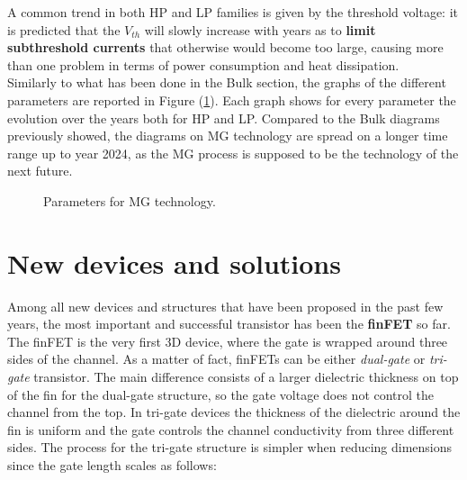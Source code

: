 \documentclass[a4paper, 12pt, twoside, openright]{report}
\begin{document}
A common trend in both HP and LP families is given by the threshold voltage: it is predicted that the $V_{th}$ will slowly increase with years as to \textbf{limit subthreshold currents} that otherwise would become too large, causing more than one problem in terms of power consumption and heat dissipation. \\ Similarly to what has been done in the Bulk section, the graphs of the different parameters are reported in Figure (\ref{MGdiagrams}). Each graph shows for every parameter the evolution over the years both for HP and LP. Compared to the Bulk diagrams previously showed, the diagrams on MG technology are spread on a longer time range up to year 2024, as the MG process is supposed to be the technology of the next future.

\begin{figure}[htp] {
\centering 
\qquad
\qquad
\qquad
\qquad
\qquad
\caption{Parameters for MG technology.}
\label{MGdiagrams} }
\end{figure}

\newpage
\section{New devices and solutions}
Among all new devices and structures that have been proposed in the past few years, the most important and successful transistor has been the \textbf{finFET} so far. The finFET is the very first 3D device, where the gate is wrapped around three sides of the channel. As a matter of fact, finFETs can be either \emph{dual-gate} or \emph{tri-gate} transistor. The main difference consists of a larger dielectric thickness on top of the fin for the dual-gate structure, so the gate voltage does not control the channel from the top. In tri-gate devices the thickness of the dielectric around the fin is uniform and the gate controls the channel conductivity from three different sides. The process for the tri-gate structure is simpler when reducing dimensions since the gate length scales as follows:
\end{document}
